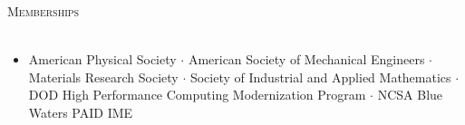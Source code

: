 \documentclass{article}
\newcommand{\lineunder}{\vspace*{-8pt} \\ \hspace*{-18pt} \hrulefill \\}
\newcommand{\header}[1]{{\hspace*{-15pt}\vspace*{6pt} \textsc{#1}} \vspace*{-6pt} \lineunder}
\newenvironment{achievements}{\begin{list}{$\bullet$}{\topsep 0pt \itemsep -2pt}}{\vspace*{4pt}\end{list}}
\begin{document}
\header{Memberships}
\begin{itemize}[leftmargin=*]
\item American Physical Society $\cdot$ American Society of Mechanical Engineers 
$\cdot$ Materials Research Society $\cdot$ Society of Industrial and Applied Mathematics $\cdot$ DOD High Performance Computing Modernization Program $\cdot$ NCSA Blue Waters PAID IME
\end{itemize}
\end{document}
